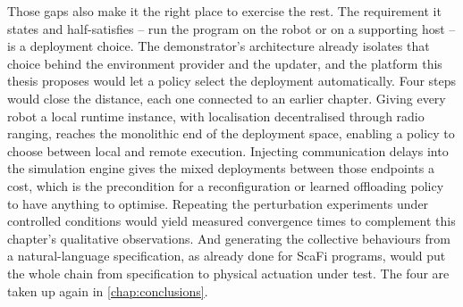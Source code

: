 Those gaps also make it the right place to exercise the rest.
%
The requirement it states and half-satisfies -- run the program on the robot or on a supporting host --
is a deployment choice.
The demonstrator's architecture already isolates that choice behind the environment provider and the updater,
and the platform this thesis proposes would let a policy select the deployment automatically.
%
Four steps would close the distance, each one connected to an earlier chapter.
%
Giving every robot a local runtime instance, with localisation decentralised through radio ranging, reaches the monolithic end of the deployment space,
enabling a policy to choose between local and remote execution.
%
Injecting communication delays into the simulation engine gives the mixed deployments between those endpoints a cost,
which is the precondition for a reconfiguration or learned offloading policy to have anything to optimise.
%
Repeating the perturbation experiments under controlled conditions would yield measured convergence times to complement this chapter's qualitative observations.
%
And generating the collective behaviours from a natural-language specification, as already done for ScaFi programs,
would put the whole chain from specification to physical actuation under test.
%
The four are taken up again in \cref{chap:conclusions}.

